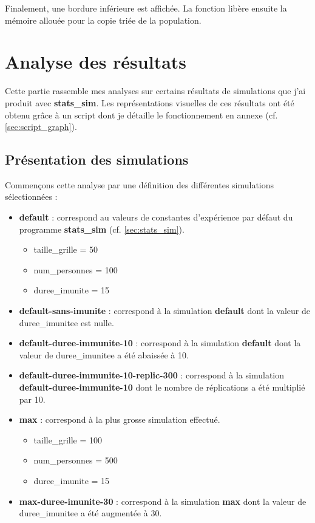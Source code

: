 \documentclass[12pt,french,titlepage]{article}
\begin{document}
Finalement, une bordure inférieure est affichée. La fonction libère ensuite la mémoire allouée pour la copie triée de la population.

\newpage

\section{Analyse des résultats}
\label{sec:analyse}

Cette partie rassemble mes analyses sur certains résultats de simulations que j'ai produit avec \textbf{stats\_sim}. Les représentations visuelles de ces résultats ont été obtenu grâce à un script dont je détaille le fonctionnement en annexe (cf. \ref{sec:script_graph}). 

\subsection{Présentation des simulations}
Commençons cette analyse par une définition des différentes simulations sélectionnées :
\begin{itemize}
\item \textbf{default} : correspond au valeurs de constantes d'expérience par défaut du programme \textbf{stats\_sim} (cf. \ref{sec:stats_sim}).
\begin{itemize}
\item taille\_grille = 50
\item num\_personnes = 100
\item duree\_imunite = 15
\end{itemize}

\item \textbf{default-sans-imunite} : correspond à la simulation \textbf{default} dont la valeur de duree\_imunitee est nulle.


\item \textbf{default-duree-immunite-10} : correspond à la simulation \textbf{default} dont la valeur de duree\_imunitee a été abaissée à 10.

\item \textbf{default-duree-immunite-10-replic-300} : correspond à la simulation \textbf{default-duree-immunite-10} dont le nombre de réplications a été multiplié par 10.\\


\item \textbf{max} : correspond à la plus grosse simulation effectué.
\begin{itemize}
\item taille\_grille = 100
\item num\_personnes = 500
\item duree\_imunite = 15
\end{itemize}

\item \textbf{max-duree-imunite-30} : correspond à la simulation \textbf{max} dont la valeur de duree\_imunitee a été augmentée à 30.

\end{itemize}
\end{document}
